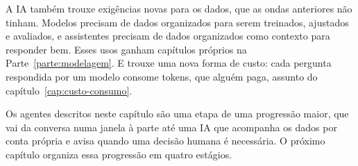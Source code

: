 A IA também trouxe exigências novas para os dados, que as ondas anteriores não tinham.
Modelos precisam de dados organizados para serem treinados, ajustados e avaliados, e
assistentes precisam de dados organizados como contexto para responder bem. Esses usos
ganham capítulos próprios na Parte~\ref{parte:modelagem}. E trouxe uma nova forma de
custo: cada pergunta respondida por um modelo consome tokens, que alguém paga, assunto do
capítulo~\ref{cap:custo-consumo}.

Os agentes descritos neste capítulo são uma etapa de uma progressão maior, que vai da
conversa numa janela à parte até uma IA que acompanha os dados por conta própria e avisa
quando uma decisão humana é necessária. O próximo capítulo organiza essa progressão em
quatro estágios.

\begin{leituras}
\end{leituras}
